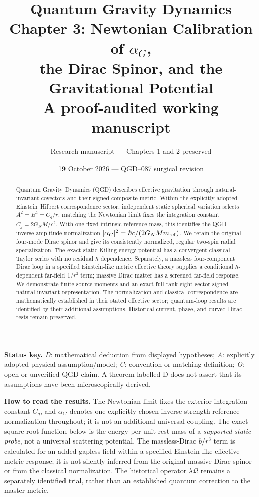 \documentclass[11pt,a4paper]{article}
\title{\textbf{Quantum Gravity Dynamics}\\[5pt]
\large Chapter 3: Newtonian Calibration of $\alpha_G$,\\ the Dirac Spinor, and the Gravitational Potential\\[5pt]
\normalsize A proof-audited working manuscript}
\author{Research manuscript --- Chapters 1 and 2 preserved}
\date{19 October 2026 --- QGD--087 surgical revision}
\theoremstyle{remark}
\begin{document}
\maketitle

\begin{abstract}
Quantum Gravity Dynamics (QGD) describes effective gravitation through natural-invariant
covectors and their signed composite metric. Within the explicitly adopted
Einstein--Hilbert correspondence sector, independent static spherical variation
selects $A^2=B^2=C_g/r$; matching the Newtonian limit fixes the integration
constant $C_g=2G_NM/c^2$. With one fixed intrinsic reference mass, this
identifies the QGD inverse-amplitude normalization
$|\alpha_G|^2=\hbar c/(2G_NMm_{\rm ref})$. We retain the original four-mode
Dirac spinor and give its consistently normalized, regular two-spin radial
specialization. The exact static Killing-energy potential has a convergent
classical Taylor series with no residual $\hbar$ dependence. Separately,
a massless four-component Dirac loop in a specified Einstein-like metric
effective theory supplies a conditional $\hbar$-dependent far-field
$1/r^3$ term; massive Dirac matter has a screened far-field response.
We demonstrate finite-source moments and an exact full-rank eight-sector
signed natural-invariant representation. The normalization and classical
correspondence are mathematically established in their stated effective
sector; quantum-loop results are identified by their additional assumptions.
Historical current, phase, and curved-Dirac tests remain preserved.
\end{abstract}

\noindent\textbf{Status key.} \emph{D}: mathematical deduction from displayed hypotheses; \emph{A}: explicitly adopted physical assumption/model; \emph{C}: convention or matching definition; \emph{O}: open or unverified QGD claim. A theorem labelled D does not assert that its assumptions have been microscopically derived.

\noindent\textbf{How to read the results.}
The Newtonian limit fixes the exterior integration constant $C_g$, and
$\alpha_G$ denotes one explicitly chosen inverse-strength reference
normalization throughout; it is not an additional universal coupling.
The exact square-root function below is the energy per unit rest mass
of a \emph{supported static probe}, not a universal scattering potential.
The massless-Dirac $b/r^3$ term is calculated for an added gapless field
within a specified Einstein-like effective-metric response; it is not
silently inferred from the original massive Dirac spinor or from the
classical normalization.  The historical operator $\lambda\mathcal Q$
remains a separately identified trial, rather than an established
quantum correction to the master metric.
\end{document}
